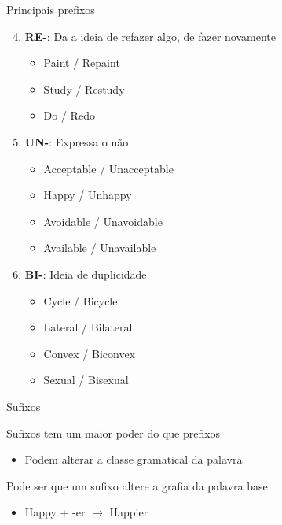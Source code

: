 \documentclass[compress,mathserif,xcolor=table]{beamer}
\begin{document}

\begin{frame}{Principais prefixos}

\begin{enumerate}
    \setcounter{enumi}{3}
    \item \textbf{RE-}: Da a ideia de refazer algo, de fazer novamente
    \begin{itemize}
        \item Paint / Repaint
        \item Study / Restudy
        \item Do / Redo
    \end{itemize}
    \vspace{1cm}
    \item \textbf{UN-}: Expressa o não
    \begin{itemize}
        \item Acceptable / Unacceptable
        \item Happy / Unhappy
        \item Avoidable / Unavoidable
        \item Available / Unavailable
    \end{itemize}
    \vspace{1cm}
    \item \textbf{BI-}: Ideia de duplicidade
    \begin{itemize}
        \item Cycle / Bicycle
        \item Lateral / Bilateral
        \item Convex / Biconvex
        \item Sexual / Bisexual
    \end{itemize}
\end{enumerate}
\end{frame}


\begin{frame}{Sufixos}

Sufixos tem um maior poder do que prefixos
\begin{itemize}
    \item Podem alterar a classe gramatical da palavra
\end{itemize}

\vspace{1.25cm}

Pode ser que um sufixo altere a grafia da palavra base
\begin{itemize}
    \item Happy + -er $\rightarrow$ Happier
\end{itemize}
\end{frame}
\end{document}
